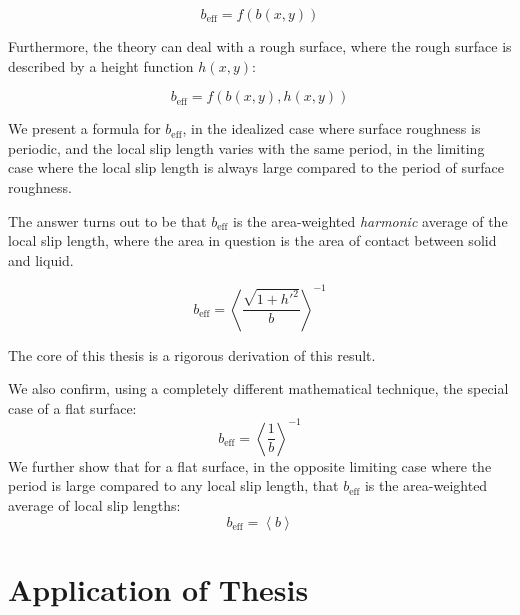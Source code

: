 \documentclass[12pt, a4paper, twoside, openright]{book}
\newcommand{\beff}{\ensuremath{b_{\mathrm{eff}}}}
\begin{document}
\begin{equation}
b_{\mathrm{eff}} = f(b(x,y))
\end{equation}

Furthermore, the theory can deal with a rough surface, where the rough surface is described by a height function $h(x,y)$:

\begin{equation}
\beff = f(b(x,y),h(x,y))
\end{equation}

We present a formula for $\beff$, in the idealized case where surface roughness is periodic, and the local slip length varies with the same period, in the limiting case where the local slip length is always large compared to the period of surface roughness.

The answer turns out to be that $\beff$ is the area-weighted \emph{harmonic} average of the local slip length, where the area in question is the area of contact between solid and liquid.


\begin{equation}
\beff = \left< \frac{\sqrt{1+h'^{2}}}{b}  \right > ^{-1}
\end{equation}

The core of this thesis is a rigorous derivation of this result.

\vspace*{1em}
We also confirm, using a completely different mathematical technique, the special case of a flat surface:
\begin{equation}
\beff = \left< \frac{1}{b}  \right > ^{-1}
\end{equation}
We further show that for a flat surface, in the opposite limiting case where the period is large compared to any local slip length, that $\beff$ is the area-weighted average of local slip lengths:
\begin{equation}
\beff = \left< b  \right >
\end{equation}


\section{Application of Thesis}

\end{document}
